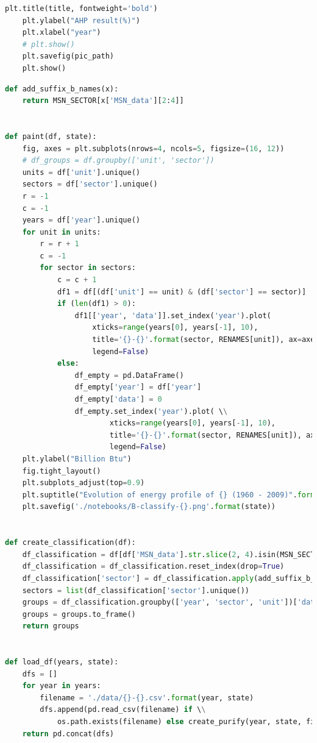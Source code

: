 \documentclass[a4paper,11pt]{article}
\begin{document}
\begin{appendices}
\begin{lstlisting}[language=Python, caption=score.py]
    plt.title(title, fontweight='bold')
    plt.ylabel("AHP result(%)")
    plt.xlabel("year")
    # plt.show()
    plt.savefig(pic_path)
    plt.show()
\end{lstlisting}

\begin{lstlisting}[language=Python, caption=classify.py]
def add_suffix_b_names(x):
    return MSN_SECTOR[x['MSN_data'][2:4]]


def paint(df, state):
    fig, axes = plt.subplots(nrows=4, ncols=5, figsize=(16, 12))
    # df_groups = df.groupby(['unit', 'sector'])
    units = df['unit'].unique()
    sectors = df['sector'].unique()
    r = -1
    c = -1
    years = df['year'].unique()
    for unit in units:
        r = r + 1
        c = -1
        for sector in sectors:
            c = c + 1
            df1 = df[(df['unit'] == unit) & (df['sector'] == sector)]
            if (len(df1) > 0):
                df1[['year', 'data']].set_index('year').plot(
                    xticks=range(years[0], years[-1], 10),
                    title='{}-{}'.format(sector, RENAMES[unit]), ax=axes[r, c],
                    legend=False)
            else:
                df_empty = pd.DataFrame()
                df_empty['year'] = df['year']
                df_empty['data'] = 0
                df_empty.set_index('year').plot( \\
                        xticks=range(years[0], years[-1], 10),
                        title='{}-{}'.format(sector, RENAMES[unit]), ax=axes[r, c],
                        legend=False)
    plt.ylabel("Billion Btu")
    fig.tight_layout()
    plt.subplots_adjust(top=0.9)
    plt.suptitle("Evolution of energy profile of {} (1960 - 2009)".format(state))
    plt.savefig('./notebooks/B-classify-{}.png'.format(state))


def create_classification(df):
    df_classification = df[df['MSN_data'].str.slice(2, 4).isin(MSN_SECTOR)]
    df_classification = df_classification.reset_index(drop=True)
    df_classification['sector'] = df_classification.apply(add_suffix_b_names, axis=1)
    sectors = list(df_classification['sector'].unique())
    groups = df_classification.groupby(['year', 'sector', 'unit'])['data'].sum()
    groups = groups.to_frame()
    return groups


def load_df(years, state):
    dfs = []
    for year in years:
        filename = './data/{}-{}.csv'.format(year, state)
        dfs.append(pd.read_csv(filename) if \\
            os.path.exists(filename) else create_purify(year, state, filename))
    return pd.concat(dfs)
\end{lstlisting}



\end{appendices}
\end{document}
